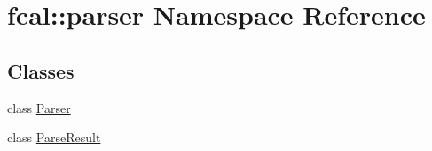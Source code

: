 \hypertarget{namespacefcal_1_1parser}{}\section{fcal\+:\+:parser Namespace Reference}
\label{namespacefcal_1_1parser}
\subsection*{Classes}
\begin{DoxyCompactItemize}
\item 
class \hyperlink{classfcal_1_1parser_1_1Parser}{Parser}
\item 
class \hyperlink{classfcal_1_1parser_1_1ParseResult}{Parse\+Result}
\end{DoxyCompactItemize}
